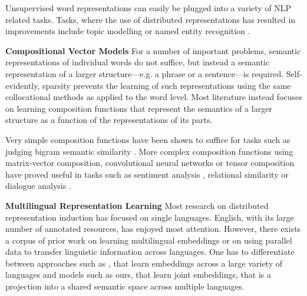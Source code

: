 \documentclass[11pt]{article}
\begin{document}
Unsupervised word representations can easily be plugged into a variety of NLP
related tasks.  Tasks, where the use of distributed representations has resulted
in improvements include topic modelling \cite{Blei:2003} or named entity
recognition \cite{Turian:2010,Collobert:2011}.

\vspace{0.05in}
\noindent\textbf{Compositional Vector Models}\hspace{0.1in}
For a number of important problems, semantic representations of individual words
do not suffice, but instead a semantic representation of a larger
structure---e.g. a phrase or a sentence---is required.  Self-evidently, sparsity
prevents the learning of such representations using the same collocational
methods as applied to the word level.  Most literature instead focuses on
learning composition functions that represent the semantics of a larger
structure as a function of the representations of its parts.

Very simple composition functions have been shown to suffice for tasks such as
judging bigram semantic similarity \cite{Mitchell:2008}.  More complex
composition functions using matrix-vector composition, convolutional neural
networks or tensor composition have proved useful in tasks such as sentiment
analysis \cite{Socher:2011,Hermann:2013:ACL}, relational similarity
\cite{Turney:2012} or dialogue analysis \cite{Kalchbrenner:2013}.

\vspace{0.05in}
\noindent\textbf{Multilingual Representation Learning}\hspace{0.1in}
Most research on distributed representation induction has focused on single
languages.  English, with its large number of annotated resources, has enjoyed
most attention.  However, there exists a corpus of prior work on learning
multilingual embeddings or on using parallel data to transfer linguistic
information across languages.  One has to differentiate between approaches such
as , that learn embeddings across a large variety of
languages and models such as ours, that learn joint embeddings, that is a
projection into a shared semantic space across multiple languages.
\end{document}
